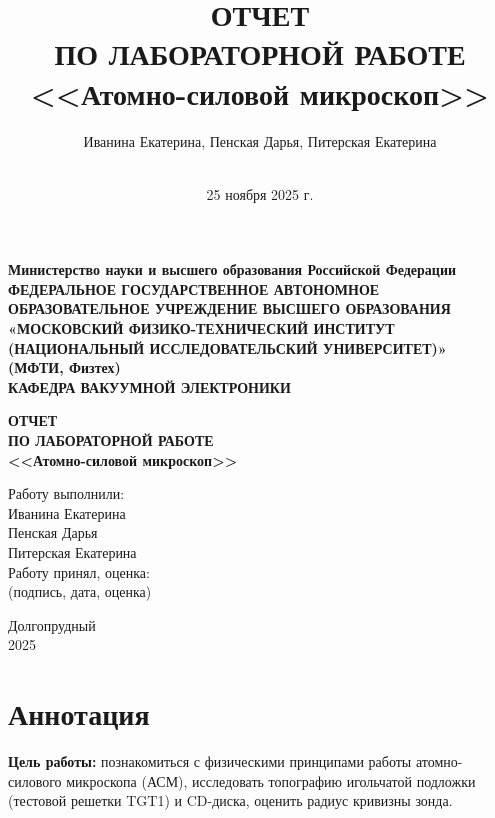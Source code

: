 \documentclass[a4paper,12pt]{article}
\title{ОТЧЕТ \\ ПО ЛАБОРАТОРНОЙ РАБОТЕ \\ <<Атомно-силовой микроскоп>>}
\author{
    Иванина Екатерина, Пенская Дарья, Питерская Екатерина \\
    \vspace{0.5cm} \\
}
\date{25 ноября 2025 г.}
\begin{document}
\begin{titlepage}
    \centering
    \vspace*{1cm}

    \textbf{Министерство науки и высшего образования Российской Федерации} \\
    \vspace{0.5cm}
    \textbf{ФЕДЕРАЛЬНОЕ ГОСУДАРСТВЕННОЕ АВТОНОМНОЕ} \\
    \textbf{ОБРАЗОВАТЕЛЬНОЕ УЧРЕЖДЕНИЕ ВЫСШЕГО ОБРАЗОВАНИЯ} \\
    \vspace{0.5cm}
    \textbf{«МОСКОВСКИЙ ФИЗИКО-ТЕХНИЧЕСКИЙ ИНСТИТУТ} \\
    \textbf{(НАЦИОНАЛЬНЫЙ ИССЛЕДОВАТЕЛЬСКИЙ УНИВЕРСИТЕТ)»} \\
    \textbf{(МФТИ, Физтех)} \\
    \vspace{1cm}
    \textbf{КАФЕДРА ВАКУУМНОЙ ЭЛЕКТРОНИКИ} \\

    \vspace{2cm}

    \textbf{ОТЧЕТ} \\
    \textbf{ПО ЛАБОРАТОРНОЙ РАБОТЕ} \\
    \vspace{1cm}
    \textbf{\Large <<Атомно-силовой микроскоп>>} \\

    \vspace{2cm}

    \begin{flushright}
        Работу выполнили: \\
        Иванина Екатерина \\
        Пенская Дарья \\
        Питерская Екатерина \\
       
        \vspace{1cm}
        Работу принял, оценка: \underline{\hspace{3cm}} \\
        \vspace{0.5cm}
        (подпись, дата, оценка)
    \end{flushright}

    \vfill
    Долгопрудный \\ 2025
\end{titlepage}

\section*{Аннотация}
\textbf{Цель работы:} познакомиться с физическими принципами работы атомно-силового микроскопа (АСМ), исследовать топографию игольчатой подложки (тестовой решетки TGT1) и CD-диска, оценить радиус кривизны зонда.
\end{document}
